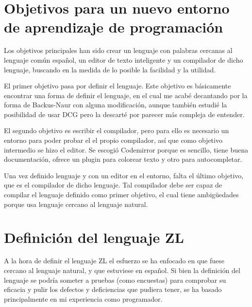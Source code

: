 \documentclass{report}
\begin{document}
	
	\section{Objetivos para un nuevo entorno de aprendizaje de programación}
	
	Los objetivos principales han sido crear un lenguaje con palabras cercanas al lenguaje común español, un editor de texto inteligente y un compilador de dicho lenguaje, buscando en la medida de lo posible la facilidad y la utilidad. 
	
	\vspace{10px}
	
	El primer objetivo pasa por definir el lenguaje. Este objetivo es básicamente encontrar una forma de definir el lenguaje, en el cual me acabé decantando por la forma de Backus-Naur\cite{bnf} con alguna modificación, aunque también estudié la posibilidad de usar DCG\cite{dcg} pero la descarté por parecer más compleja de entender. 
	
	\vspace{10px}

	El segundo objetivo es escribir el compilador, pero para ello es necesario un entorno para poder probar el el propio compilador, así que como objetivo intermedio se hizo el editor. Se escogió Codemirror porque es sencillo, tiene buena documentación, ofrece un plugin para colorear texto\cite{codemirrorsyntaxhighlight} y otro para autocompletar\cite{codemirrorautocomplete}. 
	
	\vspace{10px}
	
	Una vez definido lenguaje y  con un editor en el entorno, falta el último objetivo, que es el compilador de dicho lenguaje. Tal compilador debe ser capaz de compilar el lenguaje definido como primer objetivo, el cual tiene ambigüedades porque usa lenguaje cercano al lenguaje natural.
	
	\section{Definición del lenguaje ZL}
	
	A la hora de definir el lenguaje ZL el esfuerzo se ha enfocado en que fuese cercano al lenguaje natural, y que estuviese en español\cite{mundoingles}. Si bien la definición del lenguaje se podría someter a pruebas (como encuestas) para comprobar su eficacia y pulir los defectos y deficiencias que pudiera tener, se ha basado principalmente en mi experiencia como programador. 
	
\end{document}

